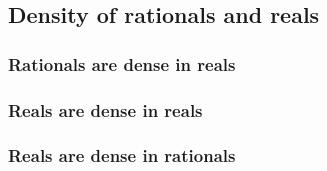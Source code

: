 
\subsection{Density of rationals and reals}

\subsubsection{Rationals are dense in reals}

\subsubsection{Reals are dense in reals}

\subsubsection{Reals are dense in rationals}


